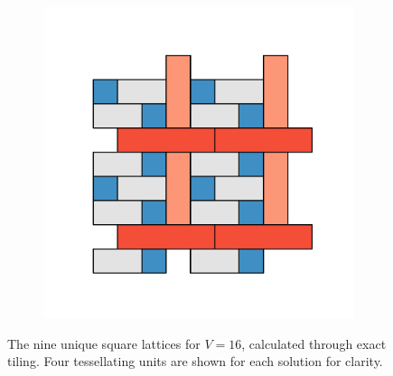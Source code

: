 \begin{figure}[bt]
\begin{subfigure}[b]{0.16\textwidth}
         \caption{}
         \label{fig:pro3pksq8}
     \end{subfigure}
	\hfill      
      \begin{subfigure}[b]{0.16\textwidth}
         \centering
         \includegraphics[width=\textwidth]{./figures/procrystals/t4.pdf}
         \caption{}
         \label{fig:pro3pksq9}
     \end{subfigure}
     \hfill
    
     \caption{The nine unique square lattices for $V=16$, calculated through exact tiling. Four tessellating units are shown for each solution for clarity.}
     \label{fig:pro3pksq}
     
     
     

\end{figure}
